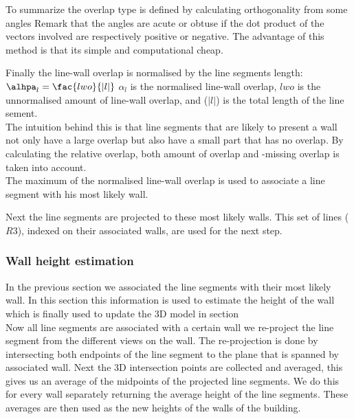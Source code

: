 \documentclass[10pt]{article}
\begin{document}
	To summarize the overlap type is defined by calculating orthogonality
	from some angles 
	Remark that the angles are acute or obtuse if the dot product of the vectors involved are
	respectively positive or negative. The advantage of this method is that
	its simple and computational cheap.
	

	
	Finally the line-wall overlap is normalised by the line segments length:\\
	$\alhpa_{l} = \fac{lwo}{|l|}$
	$\alpha_{l}$ is the normalised line-wall overlap, 
	$lwo$ is the unnormalised amount of line-wall overlap, 
	and ($|l|$) is the total length of the line sement.\\

	The intuition behind this is that line segments that are likely to
	present a wall not only have a large overlap but also have a small part
	that has no overlap. By calculating the relative overlap, both amount of overlap
	and -missing overlap is taken into account.\\


	The maximum of the normalised line-wall overlap is used to associate a
	line segment with his most likely wall.

	Next the line segments are projected to these most likely walls. This
	set of lines ($R3$), indexed on their associated walls, are used for the
	next step.


	

\subsubsection{Wall height estimation}
  	In the previous section we associated the line segments with their most
	likely wall.
	In this section this information is used to estimate the height of the
	wall which is finally used to update the 3D model in section %
	\\
	Now all line segments are associated with a certain wall we re-project the line segment from the different views on the wall. The re-projection is done by intersecting both endpoints of the line segment to the plane that is spanned by associated wall.
	Next the 3D intersection points are collected and averaged, this gives us an average of the midpoints of the projected line segments. We do this for every wall separately returning the average height of the line segments.
	These averages are then used as the new heights of the walls of the building.
\end{document}
